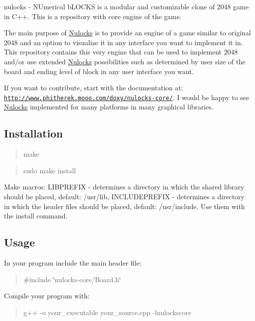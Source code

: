nulocks -\/ N\-Umerical b\-L\-O\-C\-K\-S is a modular and customizable clone of 2048 game in C++. This is a repository with core engine of the game.

The main purpose of \hyperlink{namespace_nulocks}{Nulocks} is to provide an engine of a game similar to original 2048 and an option to visualize it in any interface you want to implement it in. This repository contains this very engine that can be used to implement 2048 and/or use extended \hyperlink{namespace_nulocks}{Nulocks} possibilities such as determined by user size of the board and ending level of block in any user interface you want.

If you want to contribute, start with the documentation at\-: \href{http://www.phitherek.mooo.com/doxy/nulocks-core/}{\tt http\-://www.\-phitherek.\-mooo.\-com/doxy/nulocks-\/core/}. I would be happy to see \hyperlink{namespace_nulocks}{Nulocks} implemented for many platforms in many graphical libraries.

\subsection*{Installation }

\begin{quotation}
make

\end{quotation}


\begin{quotation}
sudo make install

\end{quotation}


Make macros\-: L\-I\-B\-P\-R\-E\-F\-I\-X -\/ determines a directory in which the shared library should be placed, default\-: /usr/lib, I\-N\-C\-L\-U\-D\-E\-P\-R\-E\-F\-I\-X -\/ determines a directory in which the header files should be placed, default\-: /usr/include. Use them with the install command.

\subsection*{Usage }

In your program include the main header file\-:

\begin{quotation}
\#include \char`\"{}nulocks-\/core/\-Board.\-h\char`\"{}

\end{quotation}


Compile your program with\-:

\begin{quotation}
g++ -\/o your\-\_\-executable your\-\_\-source.\-cpp -\/lnulockscore \end{quotation}

